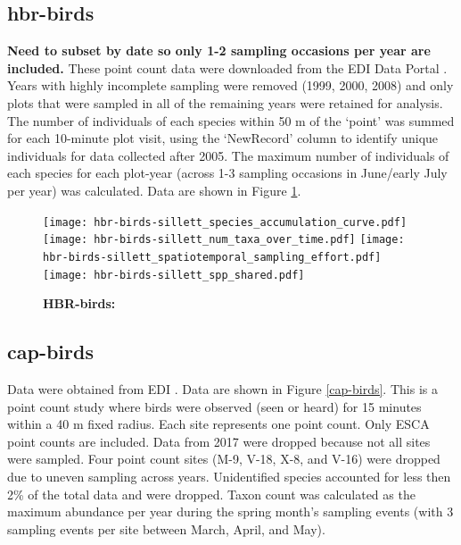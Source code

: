 \documentclass[11pt, oneside]{article}
\begin{document}
\subsection {hbr-birds}
{\bf Need to subset by date so only 1-2 sampling occasions per year are included.}
These point count data were downloaded from the EDI Data Portal \citep{hbr-birds}.
Years with highly incomplete sampling were removed (1999, 2000, 2008) and only plots that were sampled in all of the remaining years were retained for analysis.
The number of individuals of each species within 50 m of the `point' was summed for each 10-minute plot visit, using the `NewRecord' column to identify unique individuals for data collected after 2005. 
The maximum number of individuals of each species for each plot-year (across 1-3 sampling occasions in June/early July per year)  was calculated.
Data are shown in Figure \ref{hbr-birds}.


\begin{figure}[h!]
\centering
\texttt{[image: hbr-birds-sillett\_species\_accumulation\_curve.pdf]}
\texttt{[image: hbr-birds-sillett\_num\_taxa\_over\_time.pdf]}
\texttt{[image: hbr-birds-sillett\_spatiotemporal\_sampling\_effort.pdf]}
\texttt{[image: hbr-birds-sillett\_spp\_shared.pdf]}
\caption{{\bf HBR-birds:} }
\label{hbr-birds}
\end{figure}

\subsection{cap-birds}
Data were obtained from EDI \citep{cap-birds}.
Data are shown in Figure \ref{cap-birds}.
This is a point count study where birds were observed (seen or heard) for 15 minutes within a 40 m fixed radius. 
Each site represents one point count. 
Only ESCA point counts are included. 
Data from 2017 were dropped because not all sites were sampled. 
Four point count sites (M-9, V-18, X-8, and V-16) were dropped due to uneven sampling across years. 
Unidentified species accounted for less then 2\% of the total data and were dropped. 
Taxon count was calculated as the maximum abundance per year during the spring month's sampling events (with 3 sampling events per site between March, April, and May). 
  
\end{document}
